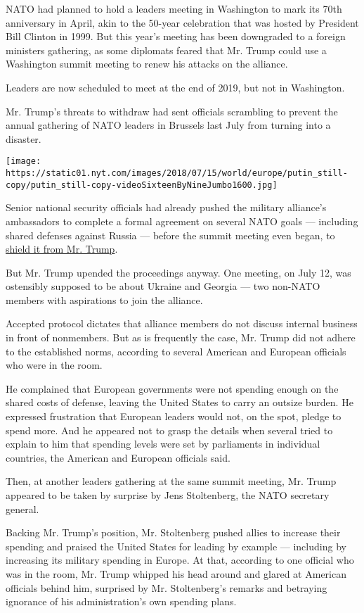 NATO had planned to hold a leaders meeting in Washington to mark its
70th anniversary in April, akin to the 50-year celebration that was
hosted by President Bill Clinton in 1999. But this year's meeting has
been downgraded to a foreign ministers gathering, as some diplomats
feared that Mr. Trump could use a Washington summit meeting to renew his
attacks on the alliance.

Leaders are now scheduled to meet at the end of 2019, but not in
Washington.

Mr. Trump's threats to withdraw had sent officials scrambling to prevent
the annual gathering of NATO leaders in Brussels last July from turning
into a disaster.

\texttt{[image: https://static01.nyt.com/images/2018/07/15/world/europe/putin\_still-copy/putin\_still-copy-videoSixteenByNineJumbo1600.jpg]}

Senior national security officials had already pushed the military
alliance's ambassadors to complete a formal agreement on several NATO
goals --- including shared defenses against Russia --- before the summit
meeting even began, to
\href{https://www.nytimes.com/2018/08/09/us/politics/nato-summit-trump.html}{shield
it from Mr. Trump}.

But Mr. Trump upended the proceedings anyway. One meeting, on July 12,
was ostensibly supposed to be about Ukraine and Georgia --- two non-NATO
members with aspirations to join the alliance.

Accepted protocol dictates that alliance members do not discuss internal
business in front of nonmembers. But as is frequently the case, Mr.
Trump did not adhere to the established norms, according to several
American and European officials who were in the room.

He complained that European governments were not spending enough on the
shared costs of defense, leaving the United States to carry an outsize
burden. He expressed frustration that European leaders would not, on the
spot, pledge to spend more. And he appeared not to grasp the details
when several tried to explain to him that spending levels were set by
parliaments in individual countries, the American and European officials
said.

Then, at another leaders gathering at the same summit meeting, Mr. Trump
appeared to be taken by surprise by Jens Stoltenberg, the NATO secretary
general.

Backing Mr. Trump's position, Mr. Stoltenberg pushed allies to increase
their spending and praised the United States for leading by example ---
including by increasing its military spending in Europe. At that,
according to one official who was in the room, Mr. Trump whipped his
head around and glared at American officials behind him, surprised by
Mr. Stoltenberg's remarks and betraying ignorance of his
administration's own spending plans.

